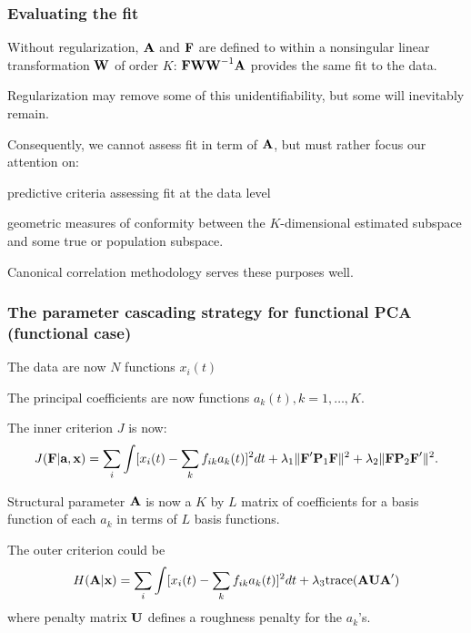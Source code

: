 \documentclass[11pt]{beamer}
\begin{document}
\begin{frame}

\frametitle{Evaluating the fit}

\bi
  \item Without regularization, $\mbox{\bf A}$ and $\mbox{\bf F}$ are defined to within a nonsingular linear transformation $\mbox{\bf W}$ of order $K$: $\mbox{\bf F} \mbox{\bf W} \mbox{\bf W}^{-1} \mbox{\bf A}$ provides the same fit to the data.
  \item Regularization may remove some of this unidentifiability, but some will inevitably remain.
  \item Consequently, we cannot assess fit in term of $\mbox{\bf A}$, but must rather focus our attention on:
  \bi
    \item predictive criteria assessing fit at the data level
    \item geometric measures of conformity between the $K$-dimensional estimated subspace and some true or population subspace.
  \ei
  \item Canonical correlation methodology serves these purposes well.
\ei

\end{frame}


\begin{frame}

\frametitle{The parameter cascading strategy for functional PCA (functional case)}

\bi
  \item The data are now $N$ functions $x_i(t)$
  \item The principal coefficients are now functions $a_k(t), k=1,\ldots,K$.
  \item The inner criterion $J$ is now:
  \[
    J(\mbox{\bf F}|\mbox{\bf a},\mbox{\bf x}) = \sum_i \int [x_i(t) - \sum_k f_{ik} a_k(t)]^2 dt +
              \lambda_1 \| \mbox{\bf F}' \mbox{\bf P}_1 \mbox{\bf F} \|^2 + \lambda_2 \| \mbox{\bf F}  \mbox{\bf P}_2 \mbox{\bf F}' \|^2.
  \]
  \item Structural parameter $\mbox{\bf A}$ is now a $K$ by $L$ matrix of coefficients for a basis function of each $a_k$ in terms of $L$ basis functions.
\ei

\end{frame}


\begin{frame}

\bi
  \item The outer criterion could be
  \[
    H(\mbox{\bf A}|\mbox{\bf x}) = \sum_i \int [x_i(t) - \sum_k f_{ik} a_k(t)]^2 dt + \lambda_3 \mbox{trace}(\mbox{\bf A} \mbox{\bf U} \mbox{\bf A}')
  \]
  where penalty matrix $\mbox{\bf U}$ defines a roughness penalty for the $a_k$'s.
\ei

\end{frame}
\end{document}
